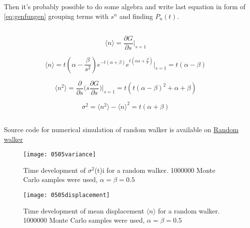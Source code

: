 \documentclass[10pt]{article}
\begin{document}
Then it's probably possible to do some algebra and write last equation in form of \ref{eq:genfungen} grouping terms with $s^n$ and finding $P_n(t)$.

\subsection{}
\begin{equation}
\langle n\rangle = \frac{\partial G}{\partial s} \Bigg|_{s=1}
\end{equation}

\begin{equation}
\langle n\rangle = t(\alpha - \frac{\beta}{s^2})e^{-t(\alpha + \beta)} e^{t(\alpha s + \frac{\beta}{s})} \Bigg|_{s=1} = t(\alpha - \beta)
\end{equation}


\begin{equation}
\langle n^2 \rangle = \frac{\partial}{\partial s} \Bigg( s\frac{\partial G}{\partial s} \Bigg) \Bigg|_{s=1} = t(t(\alpha - \beta)^2+\alpha + \beta)
\end{equation}

\begin{equation}
\sigma^2 = \langle n^2 \rangle - \langle n\rangle^2 = t(\alpha + \beta)
\end{equation}



\subsection{}

Source code for numerical simulation of random walker is available on \href{https://github.com/andrei-fys/FYS4130/blob/master/markov.cpp}{Random walker}

\begin{figure}
  \begin{center}
    \texttt{[image: 0505variance]}
    \caption {Time development of $\sigma^2$(t)i for a random walker. 1000000 Monte Carlo samples were used, $\alpha=\beta=0.5$}
    \label{fig:var}
  \end{center}
\end{figure}


\begin{figure}
  \begin{center}
    \texttt{[image: 0505displacement]}
    \caption {Time development of mean displacement $\langle n\rangle$ for a random walker. 1000000 Monte Carlo samples were used, $\alpha=\beta=0.5$}
    \label{fig:displ}
  \end{center}
\end{figure}
\end{document}
